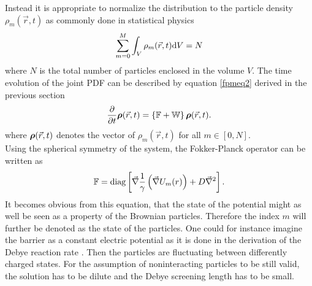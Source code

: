 Instead it is appropriate to normalize the distribution to the particle density $\rho_m(\vec{r},t)$ as commonly done in statistical physics
\begin{equation}
    \sum\limits_{m=0}^{M} \int_V \rho_m(\vec{r},t) {\rm d}V = N
    \label{densNormalization}
\end{equation}
where $N$ is the total number of particles enclosed in the volume $V$. The time evolution of the joint PDF can be described by equation \eqref{fpmeq2} derived in the previous section
\begin{equation}
    \frac{\partial}{\partial t}\boldsymbol{\mathbf{\rho}}(\vec{r},t) = \left\{ \mathbb{F} + \mathbb{W} \right\} \boldsymbol{\mathbf{\rho}}(\vec{r},t).
    \label{fpmeq3}
\end{equation}
where $\boldsymbol{\mathbf{\rho}}(\vec{r},t)$ denotes the vector of $\rho_m(\vec{r},t)$ for all $m \in [0,N]$. \\
Using the spherical symmetry of the system, the Fokker-Planck operator can be written as
\begin{equation}
    \mathbb{F} = {\rm diag}\left[ \vec{\nabla}\frac{1}{\gamma}\left( \vec{\nabla} U_m(r) \right)+ D \vec{\nabla}^{2} \right].
    \label{fpo2}
\end{equation}
It becomes obvious from this equation, that the state of the potential might as well be seen as a property of the Brownian particles. Therefore the index $m$ will further be denoted as the state of the particles. One could for instance imagine the barrier as a constant electric potential as it is done in the derivation of the Debye reaction rate \cite{Debye1942}. Then the particles are fluctuating between differently charged states. For the assumption of noninteracting particles to be still valid, the solution has to be dilute and the Debye screening length has to be small. \\
